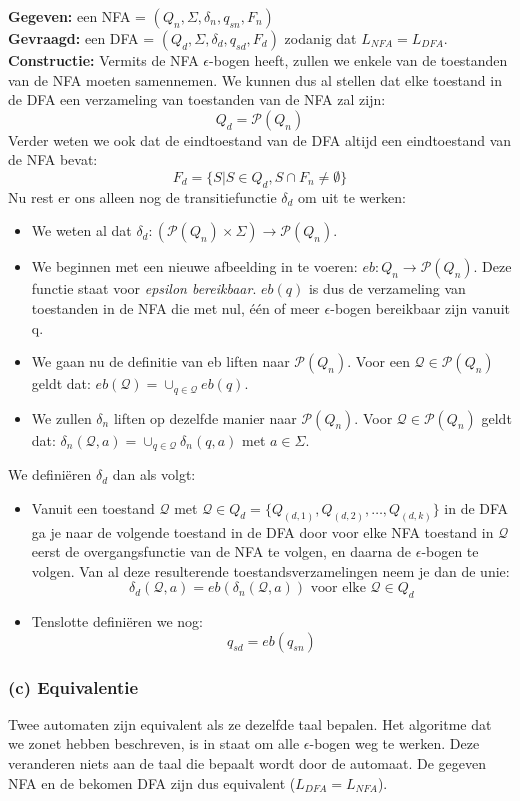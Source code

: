 \textbf{Gegeven:} een NFA = $(Q_n, \Sigma, \delta_n, q_{sn}, F_n)$ \\
\textbf{Gevraagd:} een DFA = $(Q_d, \Sigma, \delta_d, q_{sd}, F_d)$ zodanig dat $L_{NFA}=L_{DFA}$.\\
\textbf{Constructie:} Vermits de NFA $\epsilon$-bogen heeft, zullen we enkele van de toestanden van de NFA moeten samennemen. We kunnen dus al stellen dat elke toestand in de DFA een verzameling van toestanden van de NFA zal zijn:
$$ Q_d =  \mathcal{P}(Q_n)$$
Verder weten we ook dat de eindtoestand van de DFA altijd een eindtoestand van de NFA bevat:
$$ F_d = \{S | S \in Q_d, S \cap F_n \neq \emptyset \}  $$
Nu rest er ons alleen nog de transitiefunctie $\delta_d$ om uit te werken:
\begin{itemize}
\item We weten al dat $\delta_d : (\mathcal{P} (Q_n) \times \Sigma) \rightarrow \mathcal{P}(Q_n)$.
\item We beginnen met een nieuwe afbeelding in te voeren: $eb: Q_n \rightarrow \mathcal{P}(Q_n)$. Deze functie staat voor \emph{epsilon bereikbaar}. $eb(q)$ is dus de verzameling van toestanden in de NFA die met nul, \'e\'en of meer $\epsilon$-bogen bereikbaar zijn vanuit q.
\item We gaan nu de definitie van eb liften naar $\mathcal{P}(Q_n)$. Voor een $\mathcal{Q} \in \mathcal{P}(Q_n)$ geldt dat: $eb(\mathcal{Q}) = \cup_{q \in \mathcal{Q}} eb(q)$.
\item We zullen $\delta_n$ liften op dezelfde manier naar $\mathcal{P}(Q_n)$. Voor $\mathcal{Q} \in \mathcal{P}(Q_n)$ geldt dat: $\delta_n(\mathcal{Q},a) = \cup_{q \in \mathcal{Q}}\delta_n(q,a)$ met $a \in \Sigma$. 
\end{itemize}
We defini\"eren $\delta_d$ dan als volgt:
\begin{itemize}
\item Vanuit een toestand $\mathcal{Q}$ met $\mathcal{Q} \in Q_d = \{Q_{(d,1)}, Q_{(d,2)}, \dots, Q_{(d,k)}\}$  in de DFA ga je naar de volgende toestand in de DFA door voor elke NFA toestand in $\mathcal{Q}$ eerst de overgangsfunctie van de NFA te volgen, en daarna de $\epsilon$-bogen te volgen. Van al deze resulterende toestandsverzamelingen neem je dan de unie:
$$ \delta_d(\mathcal{Q},a) = eb(\delta_n(\mathcal{Q},a)) \text{ voor elke } \mathcal{Q} \in Q_d $$
\item Tenslotte defini\"eren we nog:
$$ q_{sd} = eb(q_{sn}) $$
\end{itemize}

\subsubsection*{(c) Equivalentie}
Twee automaten zijn equivalent als ze dezelfde taal bepalen. Het algoritme dat we zonet hebben beschreven, is in staat om alle $\epsilon$-bogen weg te werken. Deze veranderen niets aan de taal die bepaalt wordt door de automaat. De gegeven NFA en de bekomen DFA zijn dus equivalent ($L_{DFA} = L_{NFA}$).

